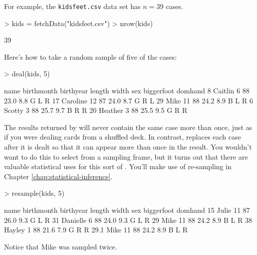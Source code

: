 For example, the \texttt{kidsfeet.csv} data set \datasetFeet has
$n=39$ cases.
\begin{Schunk}
\begin{Sinput}
> kids = fetchData("kidsfeet.csv")
> nrow(kids)
\end{Sinput}
\begin{Soutput}
[1] 39
\end{Soutput}
\end{Schunk}
Here's how to take a random sample of five of the cases:
\begin{Schunk}
\begin{Sinput}
> deal(kids, 5)
\end{Sinput}
\begin{Soutput}
       name birthmonth birthyear length width sex biggerfoot domhand
8   Caitlin          6        88   23.0   8.8   G          L       R
17 Caroline         12        87   24.0   8.7   G          R       L
29     Mike         11        88   24.2   8.9   B          L       R
6    Scotty          3        88   25.7   9.7   B          R       R
20  Heather          3        88   25.5   9.5   G          R       R
\end{Soutput}
\end{Schunk}



The results returned by  will never contain the same
case more than once, just as if you were dealing cards from a shuffled
deck.  In contrast,  replaces each case after it is
dealt so that it can appear more than once in the result.  You
wouldn't want to do this to select from a sampling frame, but it turns
out that there are valuable statistical uses for this 
sort of .  You'll make use of re-sampling in Chapter \ref{chap:statistical-inference}.


\begin{Schunk}
\begin{Sinput}
> resample(kids, 5)
\end{Sinput}
\begin{Soutput}
         name birthmonth birthyear length width sex biggerfoot domhand
15      Julie         11        87   26.0   9.3   G          L       R
31   Danielle          6        88   24.0   9.3   G          L       R
29       Mike         11        88   24.2   8.9   B          L       R
38     Hayley          1        88   21.6   7.9   G          R       R
29.1     Mike         11        88   24.2   8.9   B          L       R
\end{Soutput}
\end{Schunk}

Notice that Mike was sampled twice.

